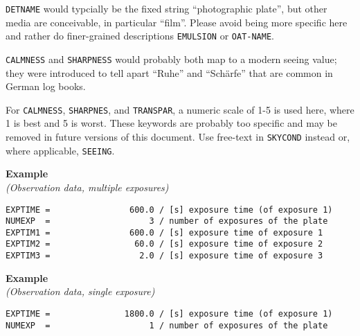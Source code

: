 \documentclass[11pt]{ivoa}
\newcommand\cardname[1]{\texttt{\color{keyword}#1}}
\newenvironment{fitsexample}[1]
{\bigskip\noindent\textbf{Example}\\\textit{(#1)\smallskip}}
{\medskip}
\begin{document}
\cardname{DETNAME} would typcially be the fixed string ``photographic
plate'', but other media are conceivable, in particular ``film''.
Please avoid being more specific here and rather do finer-grained
descriptions \cardname{EMULSION} or \cardname{OAT-NAME}.

\cardname{CALMNESS} and \cardname{SHARPNESS} would probably both map to
a modern seeing value; they were introduced to tell apart ``Ruhe'' and
``Schärfe'' that are common in German log books.

For \cardname{CALMNESS}, \cardname{SHARPNES}, and \cardname{TRANSPAR}, a
numeric scale of 1-5 is used here, where 1 is best and 5 is worst.
These keywords are probably too specific and may be removed in future
versions of this document.  Use free-text in \cardname{SKYCOND} instead
or, where applicable, \cardname{SEEING}.

\begin{fitsexample}{Observation data, multiple exposures}
\begin{lstlisting}
EXPTIME =                600.0 / [s] exposure time (of exposure 1)
NUMEXP  =                    3 / number of exposures of the plate
EXPTIM1 =                600.0 / [s] exposure time of exposure 1
EXPTIM2 =                 60.0 / [s] exposure time of exposure 2
EXPTIM3 =                  2.0 / [s] exposure time of exposure 3
\end{lstlisting}
\end{fitsexample}

\begin{fitsexample}{Observation data, single exposure}
\begin{lstlisting}
EXPTIME =               1800.0 / [s] exposure time (of exposure 1)
NUMEXP  =                    1 / number of exposures of the plate
\end{lstlisting}
\end{fitsexample}
\end{document}
